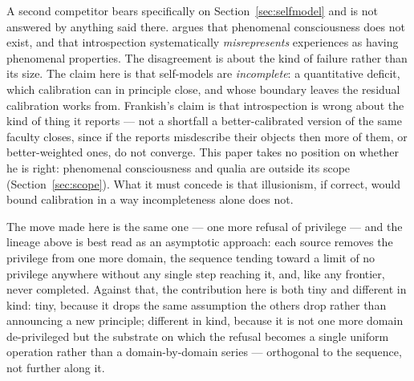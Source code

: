 \documentclass[11pt,a4paper]{article}
\theoremstyle{remark}\newtheorem{remark}[definition]{Remark}
\begin{document}
A second competitor bears specifically on Section~\ref{sec:selfmodel} and is not
answered by anything said there. \citet{frankish2016} argues that phenomenal
consciousness does not exist, and that introspection systematically
\emph{misrepresents} experiences as having phenomenal properties. The disagreement is
about the kind of failure rather than its size. The claim here is that self-models are
\emph{incomplete}: a quantitative deficit, which calibration can in principle close,
and whose boundary leaves the residual calibration works from. Frankish's claim is that
introspection is wrong about the kind of thing it reports --- not a shortfall a
better-calibrated version of the same faculty closes, since if the reports misdescribe
their objects then more of them, or better-weighted ones, do not converge. This paper
takes no position on whether he is right: phenomenal consciousness and qualia are
outside its scope (Section~\ref{sec:scope}). What it must concede is that illusionism,
if correct, would bound calibration in a way incompleteness alone does not.

The move made here is the same one --- one more refusal of privilege --- and the lineage
above is best read as an asymptotic approach: each source removes the privilege from one
more domain, the sequence tending toward a limit of no privilege anywhere without any
single step reaching it, and, like any frontier, never completed. Against that, the
contribution here is both tiny and different in kind: tiny, because it drops the same
assumption the others drop rather than announcing a new principle; different in kind,
because it is not one more domain de-privileged but the substrate on which the refusal
becomes a single uniform operation rather than a domain-by-domain series --- orthogonal
to the sequence, not further along it.
\end{document}
